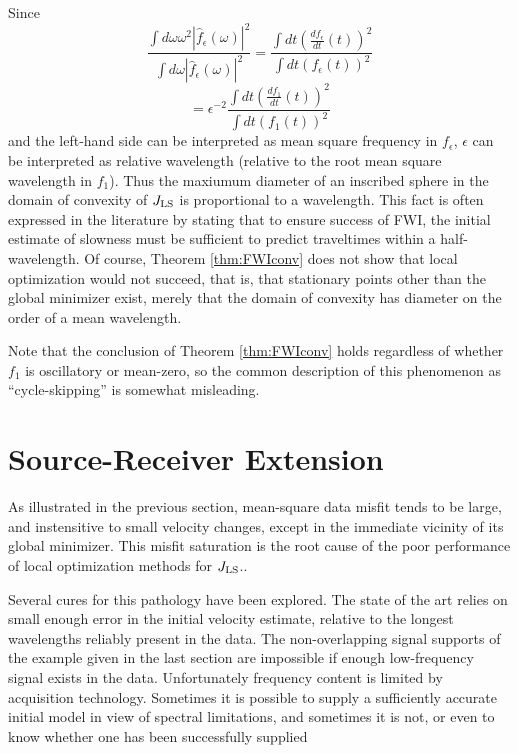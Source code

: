 \begin{rem} Since 
\[
\frac{\int d\omega \omega^2 |\hat{f}_{\epsilon}(\omega)|^2}{\int
  d\omega |\hat{f}_{\epsilon}(\omega)|^2}
= \frac{\int dt \left(\frac{df_{\epsilon}}{dt}(t)\right)^2}{\int dt
  \left(f_{\epsilon}(t)\right)^2}
\]
\[
=\epsilon^{-2}\frac{\int dt \left(\frac{df_{1}}{dt}(t)\right)^2}{\int dt
  \left(f_{1}(t)\right)^2}
\]
and the left-hand side can be interpreted as mean square frequency in
$f_{\epsilon}$, $\epsilon$ can be interpreted as relative wavelength
(relative to the root mean square wavelength in $f_1$). Thus the maxiumum
diameter of an inscribed sphere in the domain of convexity of $J_{\rm
  LS}$ is proportional to a wavelength. This fact is often expressed
in the literature by stating that to ensure success of FWI, the
initial estimate of slowness must be sufficient to predict traveltimes
within a half-wavelength. Of course, Theorem \ref{thm:FWIconv} does not show that
local optimization would not succeed, that is, that stationary points
other than the global minimizer exist, merely that the domain of
convexity has diameter on the order of a mean wavelength. 

Note that the conclusion of Theorem \ref{thm:FWIconv} holds regardless of whether
$f_1$ is oscillatory or mean-zero, so the common description of this
phenomenon as ``cycle-skipping'' is somewhat misleading.
\end{rem}

\section{Source-Receiver Extension}

As illustrated in the previous section, mean-square data misfit tends
to be large, and instensitive to small
velocity changes, except in the immediate vicinity of its global
minimizer. This misfit saturation is the root cause of the poor
performance of local optimization methods for $J_{\rm LS}$..

Several cures for this pathology have been explored. The state of the
art relies on small enough error in the initial velocity estimate,
relative to the longest wavelengths reliably present in the data. The non-overlapping
signal supports of the example given in the last section are
impossible if enough low-frequency signal exists in the
data. Unfortunately frequency content is limited by acquisition
technology. Sometimes it is possible to supply a sufficiently
accurate initial model in view of spectral limitations, and sometimes
it is not, or even to know
whether one has been successfully supplied

